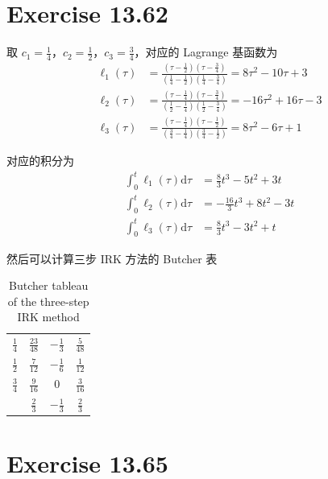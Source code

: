 \documentclass[a4paper]{article}
\begin{document}
\section*{Exercise 13.62}

\par 取 $c_1=\frac{1}{4}$，$c_2=\frac{1}{2}$，$c_3=\frac{3}{4}$，对应的
Lagrange 基函数为
\begin{equation}
    \begin{aligned}
        \ell_1(\tau) &= \frac{(\tau-\frac{1}{2})(\tau-\frac{3}{4})}{(\frac{1}{4}-\frac{1}{2})(\frac{1}{4}-\frac{3}{4})} = 8\tau^2 - 10\tau + 3\\
        \ell_2(\tau) &= \frac{(\tau-\frac{1}{4})(\tau-\frac{3}{4})}{(\frac{1}{2}-\frac{1}{4})(\frac{1}{2}-\frac{3}{4})} = -16\tau^2 + 16\tau - 3\\
        \ell_3(\tau) &= \frac{(\tau-\frac{1}{4})(\tau-\frac{1}{2})}{(\frac{3}{4}-\frac{1}{4})(\frac{3}{4}-\frac{1}{2})} = 8\tau^2 - 6\tau + 1
    \end{aligned}
\end{equation}
\par 对应的积分为
\begin{equation}
    \begin{aligned}
        \int_0^t \ell_1(\tau) \text{d}\tau &= \frac{8}{3}t^3 - 5t^2 + 3t\\
        \int_0^t \ell_2(\tau) \text{d}\tau &= -\frac{16}{3}t^3 + 8t^2 - 3t\\
        \int_0^t \ell_3(\tau) \text{d}\tau &= \frac{8}{3}t^3 - 3t^2 + t
    \end{aligned}
\end{equation}
\par 然后可以计算三步 IRK 方法的 Butcher 表
\begin{table}[htbp]
    \centering
    \caption{Butcher tableau of the three-step IRK method}
    \begin{tabular}{c|ccc}
        $\frac{1}{4}$ & $\frac{23}{48}$ & $-\frac{1}{3}$ & $\frac{5}{48}$\\
        $\frac{1}{2}$ & $\frac{7}{12}$ & $-\frac{1}{6}$ & $\frac{1}{12}$\\
        $\frac{3}{4}$ & $\frac{9}{16}$ & 0 & $\frac{3}{16}$\\
        \hline
        ~ & $\frac{2}{3}$ & $-\frac{1}{3}$ & $\frac{2}{3}$\\
    \end{tabular}
\end{table}

\section*{Exercise 13.65}
\end{document}
